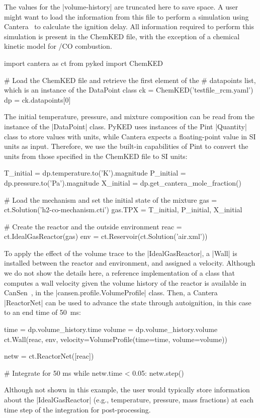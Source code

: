 \documentclass[12pt]{ijck}
\newcommand\ck{ChemKED}
\newcommand\pk{PyKED}
\begin{document}
%
The values for the \yabox|volume-history| are truncated here to save space. A user
might want to load the information from this file to perform a simulation using
Cantera~\autocite{Cantera:2.3.0} to calculate the ignition delay. All information
required to perform this simulation is present in the \ck{} file, with the exception
of a chemical kinetic model for \slash {CO} combustion.
%
\begin{pythonbox}
import cantera as ct
from pyked import ChemKED

# Load the ChemKED file and retrieve the first element of the
# datapoints list, which is an instance of the DataPoint class
ck = ChemKED('testfile_rcm.yaml')
dp = ck.datapoints[0]
\end{pythonbox}
%
The initial temperature, pressure, and mixture composition can be read from the
instance of the \pybox|DataPoint| class. \pk{} uses instances of the Pint \pybox|Quantity| class to
store values with units, while Cantera expects a floating-point value in SI
units as input. Therefore, we use the built-in capabilities of Pint to convert
the units from those specified in the \ck{} file to SI units:
%
\begin{pythonbox}
T_initial = dp.temperature.to('K').magnitude
P_initial = dp.pressure.to('Pa').magnitude
X_initial = dp.get_cantera_mole_fraction()

# Load the mechanism and set the initial state of the mixture
gas = ct.Solution('h2-co-mechanism.cti')
gas.TPX = T_initial, P_initial, X_initial

# Create the reactor and the outside environment
reac = ct.IdealGasReactor(gas)
env = ct.Reservoir(ct.Solution('air.xml'))
\end{pythonbox}
%
To apply the effect of the volume trace to the \pybox|IdealGasReactor|, a
\pybox|Wall| is installed between the reactor and environment, and assigned
a velocity. Although we do not show the details here, a reference implementation
of a class that computes a wall velocity given the volume history of the reactor
is available in CanSen~\autocite{cansen}, in the
\pybox|cansen.profile.VolumeProfile| class. Then, a Cantera \pybox|ReactorNet|
can be used to advance the state through autoignition, in this case to an end
time of \SI{50}{\milli\second}:
%
\begin{pythonbox}
time = dp.volume_history.time
volume = dp.volume_history.volume
ct.Wall(reac, env, velocity=VolumeProfile(time=time, volume=volume))

netw = ct.ReactorNet([reac])

# Integrate for 50 ms
while netw.time < 0.05:
    netw.step()
\end{pythonbox}
%
Although not shown in this example, the user would typically store information
about the \pybox|IdealGasReactor| (e.g., temperature, pressure, mass fractions)
at each time step of the integration for post-processing.
\end{document}

